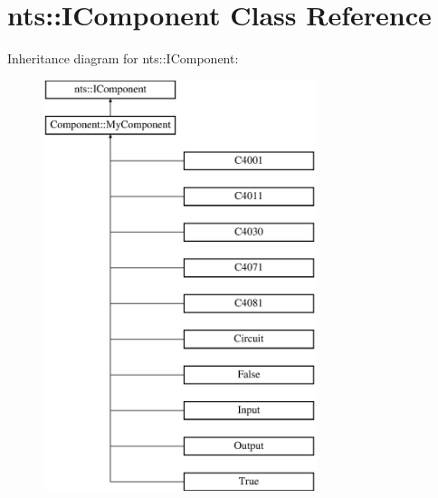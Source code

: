 \hypertarget{classnts_1_1IComponent}{}\section{nts\+:\+:I\+Component Class Reference}
\label{classnts_1_1IComponent}
Inheritance diagram for nts\+:\+:I\+Component\+:\begin{figure}[H]
\begin{center}
\leavevmode
\includegraphics[height=12.000000cm]{classnts_1_1IComponent}
\end{center}
\end{figure}
